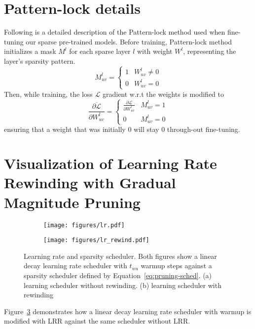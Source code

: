 \documentclass{article}
\begin{document}
\section{Pattern-lock details}
\label{app:pattern-lock}
Following is a detailed description of the Pattern-lock method used when fine-tuning our sparse pre-trained models.
Before training, Pattern-lock method initializes a mask $M^l$ for each sparse layer $l$ with weight $W^l$, representing the layer's sparsity pattern.
\begin{equation}
\label{eq:mask-init}
    M^l_{uv} = 
    \begin{cases}
    1 & W^l_{uv} \ne 0 \\
    0 & W^l_{uv} = 0
    \end{cases}
\end{equation}
Then, while training, the loss $\mathcal{L}$ gradient w.r.t the weights is modified to
\begin{equation}
    \overline{\frac{\partial \mathcal{L}}{\partial W^l_{uv}}} = 
    \begin{cases}
    \frac{\partial \mathcal{L}}{\partial W^l_{uv}} & M^l_{uv} = 1 \\
    0 & M^l_{uv} = 0
    \end{cases}
\end{equation}
ensuring that a weight that was initially $0$ will stay $0$ through-out fine-tuning.

\section{Visualization of Learning Rate Rewinding with Gradual Magnitude Pruning}
\label{app:lrr-visual}
\begin{figure}[t]
    \centering
    \begin{subfigure}[b]{0.49\textwidth}
        \centering
        \texttt{[image: figures/lr.pdf]}
        \caption{}
        \label{fig:lr_norewind_sparsity_sched}
    \end{subfigure}
    \hfill
    \begin{subfigure}[b]{0.49\textwidth}
        \centering
        \texttt{[image: figures/lr\_rewind.pdf]}
        \caption{}
        \label{fig:lr_rewind_sparsity_sched}
    \end{subfigure}
    \caption{Learning rate and sparsity scheduler. Both figures show a linear decay learning rate scheduler with $t_{wu}$ warmup steps against a sparsity scheduler defined by Equation~\ref{eq:pruning-sched}. (a) learning scheduler without rewinding. (b) learning scheduler with rewinding}
    \label{fig:lr_sparsity_sched}
\end{figure}
Figure~\ref{fig:lr_sparsity_sched} demonstrates how a linear decay learning rate scheduler with warmup is modified with LRR against the same scheduler without LRR.
\end{document}
